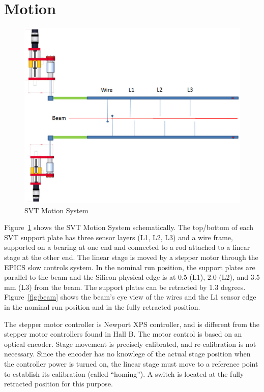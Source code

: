 \documentclass[12pt]{report}
\begin{document}
\section{Motion}
\begin{figure}[ht!]
\centering
\includegraphics[width=15cm]{motion.eps}
\caption{SVT Motion System}
\label{fig:motion}
\end{figure}

Figure~\ref{fig:motion} shows the SVT Motion System schematically. The top/bottom of each SVT support plate has three sensor layers (L1, L2, L3) and a wire frame, supported on a bearing at one end and connected to a rod attached to a linear stage at the other end. The linear stage is moved by a stepper motor through the EPICS slow controls system. In the nominal run position, the support plates are parallel to the beam and the Silicon physical edge is at 0.5 (L1), 2.0 (L2), and 3.5 mm (L3) from the beam. The support plates can be retracted by 1.3 degrees. Figure~\ref{fig:beam} shows the beam's eye view of the wires and the L1 sensor edge in the nominal run position and in the fully retracted position.

The stepper motor controller is Newport XPS controller, and is different from the stepper motor controllers found in Hall B. The motor control is based on an optical encoder. Stage movement is precisely calibrated, and re-calibration is not necessary. Since the encoder has no knowlege of the actual stage position when the controller power is turned on, the linear stage must move to a reference point to establish its calibration (called ``homing''). A switch is located at the fully retracted position for this purpose. 
\end{document}
